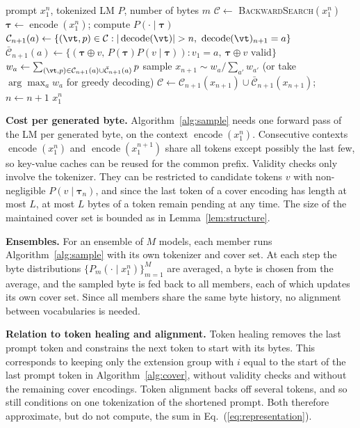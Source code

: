 \documentclass{article} %
\newcommand{\enc}{\operatorname{encode}}
\newcommand{\dec}{\operatorname{decode}}
\newcommand{\alphabet}{\mathcal{A}}
\providecommand{\vtau}{\boldsymbol{\tau}}
\begin{document}
\begin{algorithm}[t]
\caption{Exact next-byte sampling from a tokenized LM}
\label{alg:sample}
\begin{algorithmic}[1]
\Require prompt $x_1^n$, tokenized LM $P$, number of bytes $m$
\State $\mathcal{C} \gets$ \textsc{BackwardSearch}$(x_1^n)$ 
  \State $\vtau \gets \enc(x_1^n)$; compute $P(\cdot\mid\vtau)$ \Comment{one model call; $P(\vtau)$ is stored in $\mathcal{C}$}
  \For{each $a \in \alphabet$}
    \State $\mathcal{C}_{n+1}(a) \gets \{(\vt,p)\in\mathcal{C} : |\dec(\vt)|>n,\ \dec(\vt)_{n+1}=a\}$ 
    \State $\bar{\mathcal{C}}_{n+1}(a) \gets \{(\vtau\oplus v,\, P(\vtau)P(v\mid\vtau)) : v_1 = a,\ \vtau\oplus v \text{ valid}\}$ 
    \State $w_a \gets \sum_{(\vt,p)\in \mathcal{C}_{n+1}(a)\cup\bar{\mathcal{C}}_{n+1}(a)} p$ 
  \EndFor
  \State sample $x_{n+1} \sim w_a / \sum_{a'} w_{a'}$ (or take $\arg\max_a w_a$ for greedy decoding)
  \State $\mathcal{C} \gets \mathcal{C}_{n+1}(x_{n+1}) \cup \bar{\mathcal{C}}_{n+1}(x_{n+1})$; \; $n \gets n+1$
\EndFor
\State \Return $x_1^{n}$
\end{algorithmic}
\end{algorithm}

\textbf{Cost per generated byte.} Algorithm~\ref{alg:sample} needs one forward pass of the LM per generated byte, on the context $\enc(x_1^n)$. Consecutive contexts $\enc(x_1^{n})$ and $\enc(x_1^{n+1})$ share all tokens except possibly the last few, so key-value caches can be reused for the common prefix. Validity checks only involve the tokenizer. They can be restricted to candidate tokens $v$ with non-negligible $P(v\mid\vtau_n)$, and since the last token of a cover encoding has length at most $L$, at most $L$ bytes of a token remain pending at any time. The size of the maintained cover set is bounded as in Lemma~\ref{lem:structure}.

\textbf{Ensembles.} For an ensemble of $M$ models, each member runs Algorithm~\ref{alg:sample} with its own tokenizer and cover set. At each step the byte distributions $\{P_m(\cdot\mid x_1^n)\}_{m=1}^M$ are averaged, a byte is chosen from the average, and the sampled byte is fed back to all members, each of which updates its own cover set. Since all members share the same byte history, no alignment between vocabularies is needed.

\textbf{Relation to token healing and alignment.} Token healing removes the last prompt token and constrains the next token to start with its bytes. This corresponds to keeping only the extension group with $i$ equal to the start of the last prompt token in Algorithm~\ref{alg:cover}, without validity checks and without the remaining cover encodings. Token alignment backs off several tokens, and so still conditions on one tokenization of the shortened prompt. Both therefore approximate, but do not compute, the sum in Eq.~(\ref{eq:representation}).
\end{document}
